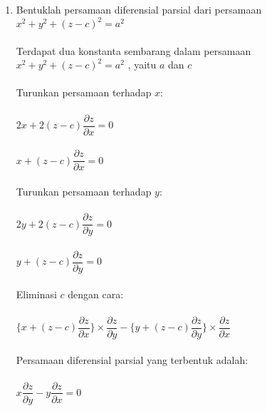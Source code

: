 \begin{enumerate}[1.]

	\item Bentuklah persamaan diferensial parsial dari persamaan \begin{math} x^{2} + y^{2} + (z - c)^{2} = a^{2} \end{math} \\ \\
	Terdapat dua konstanta sembarang dalam persamaan \begin{math} x^{2} + y^{2} + (z - c)^{2} = a^{2} \end{math} , yaitu \begin{math} a \end{math} dan \begin{math} c \end{math} \\ \\
	Turunkan persamaan terhadap \begin{math} x \end{math}: \\ \\
	\begin{math} 2x + 2 (z - c) \dfrac{\partial z}{\partial x} = 0 \end{math} \\ \\
	\begin{math} x + (z - c) \dfrac{\partial z}{\partial x} = 0 \end{math} \\ \\
	Turunkan persamaan terhadap \begin{math} y \end{math}: \\ \\
	\begin{math} 2y + 2 (z - c) \dfrac{\partial z}{\partial y} = 0 \end{math} \\ \\
	\begin{math} y + (z - c) \dfrac{\partial z}{\partial y} = 0 \end{math} \\ \\
	Eliminasi \begin{math} c \end{math} dengan cara:  \\ \\
	\begin{math} \bigg\{ x + (z - c) \dfrac{\partial z}{\partial x} \bigg\} \times \dfrac{\partial z}{\partial y} -  \bigg\{ y + (z - c) \dfrac{\partial z}{\partial y} \bigg\} \times \dfrac{\partial z}{\partial x} \end{math} \\ \\
	Persamaan diferensial parsial yang terbentuk adalah: \\ \\
	\begin{math} x \dfrac{\partial z}{\partial y} - y \dfrac{\partial z}{\partial x} = 0 \end{math}

\end{enumerate}

